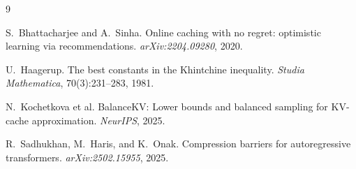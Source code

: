 \documentclass{article}
\theoremstyle{definition}
\theoremstyle{remark}
\begin{document}

\begin{thebibliography}{9}

S.~Bhattacharjee and A.~Sinha. Online caching with no regret: optimistic learning via recommendations. \emph{arXiv:2204.09280}, 2020.

U.~Haagerup. The best constants in the Khintchine inequality. \emph{Studia Mathematica}, 70(3):231--283, 1981.

N.~Kochetkova et al. BalanceKV: Lower bounds and balanced sampling for KV-cache approximation. \emph{NeurIPS}, 2025.

R.~Sadhukhan, M.~Haris, and K.~Onak. Compression barriers for autoregressive transformers. \emph{arXiv:2502.15955}, 2025.

\end{thebibliography}
\end{document}
